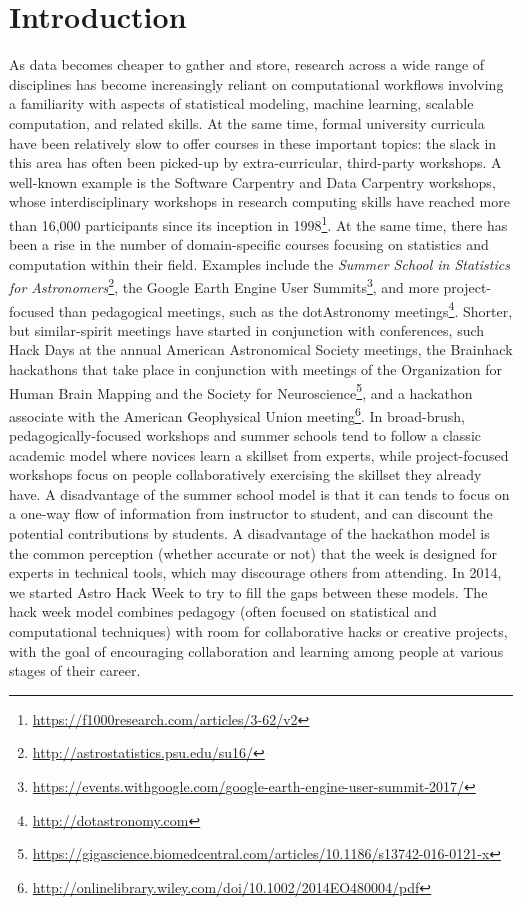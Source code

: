 \section*{Introduction}
\label{sec:introduction}

As data becomes cheaper to gather and store, research across a wide range of disciplines has become increasingly reliant on computational workflows involving a familiarity with aspects of statistical modeling, machine learning, scalable computation, and related skills.
At the same time, formal university curricula have been relatively slow to offer courses in these important topics: the slack in this area has often been picked-up by extra-curricular, third-party workshops.
A well-known example is the Software Carpentry and Data Carpentry workshops, whose interdisciplinary workshops in research computing skills have reached more than 16,000 participants since its inception in 1998\footnote{\url{https://f1000research.com/articles/3-62/v2}}.
At the same time, there has been a rise in the number of domain-specific courses focusing on statistics and computation within their field.
Examples include the \textit{Summer School in Statistics for Astronomers}\footnote{\url{http://astrostatistics.psu.edu/su16/}}, the Google Earth Engine User Summits\footnote{\url{https://events.withgoogle.com/google-earth-engine-user-summit-2017/}}, and more project-focused than pedagogical meetings, such as the dotAstronomy meetings\footnote{\url{http://dotastronomy.com}}.
Shorter, but similar-spirit meetings have started in conjunction with conferences, such Hack Days at the annual American Astronomical Society meetings, the Brainhack hackathons that take place in conjunction with meetings of the Organization for Human Brain Mapping and the Society for Neuroscience\footnote{\url{https://gigascience.biomedcentral.com/articles/10.1186/s13742-016-0121-x}}, and a hackathon associate with the American Geophysical Union meeting\footnote{\url{http://onlinelibrary.wiley.com/doi/10.1002/2014EO480004/pdf}}.
In broad-brush, pedagogically-focused workshops and summer schools tend to follow a classic academic model where novices learn a skillset from experts, while project-focused workshops focus on people collaboratively exercising the skillset they already have.
A disadvantage of the summer school model is that it can tends to focus on a one-way flow of information from instructor to student, and can discount the potential contributions by students.
A disadvantage of the hackathon model is the common perception (whether accurate or not) that the week is designed for experts in technical tools, which may discourage others from attending.
In 2014, we started Astro Hack Week to try to fill the gaps between these models.
The hack week model combines pedagogy (often focused on statistical and computational techniques) with room for collaborative hacks or creative projects, with the goal of encouraging collaboration and learning among people at various stages of their career.

